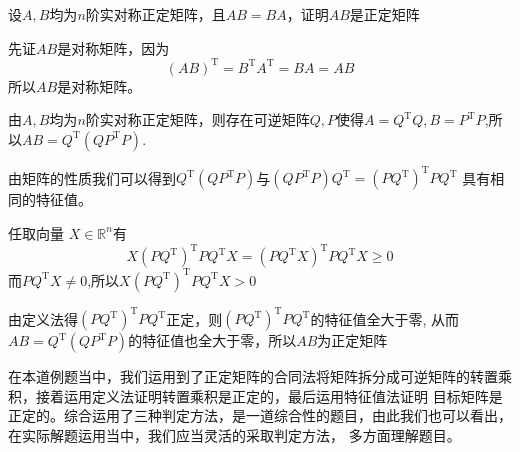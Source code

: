 \begin{example}
  设$A,B$均为$n$阶实对称正定矩阵，且$AB=BA$，证明$AB$是正定矩阵
\end{example}
\begin{solution}

  先证$AB$是对称矩阵，因为$$(AB)^\mathrm{T}=B^\mathrm{T}A^\mathrm{T}=BA=AB$$所以$AB$是对称矩阵。

  由$A,B$均为$n$阶实对称正定矩阵，则存在可逆矩阵$Q,P$使得$A=Q^\mathrm{T}Q,B=P^\mathrm{T}P$,所以$AB=Q^\mathrm{T}(QP^\mathrm{T}P)$.

  由矩阵的性质我们可以得到$Q^\mathrm{T}(QP^\mathrm{T}P)$与$(QP^\mathrm{T}P)Q^\mathrm{T}=(PQ^\mathrm{T})^\mathrm{T}PQ^\mathrm{T}$
  具有相同的特征值。
  
  任取向量 $X \in \mathbb{R}^n$有
  $$X(PQ^\mathrm{T})^\mathrm{T}PQ^\mathrm{T}X=(PQ^\mathrm{T}X)^\mathrm{T}PQ^\mathrm{T}X\geqslant0$$
  而$PQ^\mathrm{T}X\neq0$,所以$X(PQ^\mathrm{T})^\mathrm{T}PQ^\mathrm{T}X>0$

  由定义法得$(PQ^\mathrm{T})^\mathrm{T}PQ^\mathrm{T}$正定，则$(PQ^\mathrm{T})^\mathrm{T}PQ^\mathrm{T}$的特征值全大于零,
  从而$AB=Q^\mathrm{T}(QP^\mathrm{T}P)$的特征值也全大于零，所以$AB$为正定矩阵
\end{solution}
在本道例题当中，我们运用到了正定矩阵的合同法将矩阵拆分成可逆矩阵的转置乘积，接着运用定义法证明转置乘积是正定的，最后运用特征值法证明
目标矩阵是正定的。综合运用了三种判定方法，是一道综合性的题目，由此我们也可以看出，在实际解题运用当中，我们应当灵活的采取判定方法，
多方面理解题目。